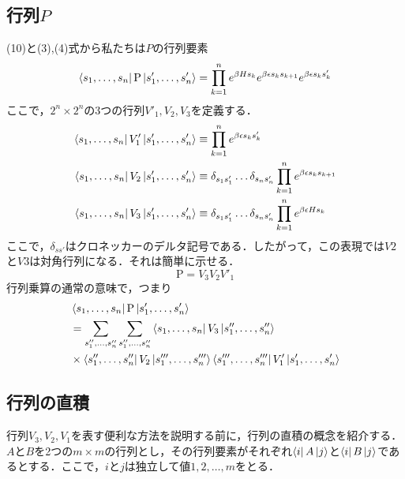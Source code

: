 \documentclass[a4paper,11pt]{jsarticle}
\begin{document}
\subsection*{行列$P$}
(10)と(3),(4)式から私たちは$P$の行列要素
\begin{equation}
  \bra{s_1,\dots,s_n}\mathrm{P}\ket{s'_1,\dots,s'_n} 
  = \prod_{k=1}^n e^{\beta H s_k} e^{\beta \epsilon s_k s_{k+1}} e^{\beta \epsilon s_k s'_k}
\end{equation}
ここで，$2^n \times 2^n$の3つの行列$V'_1, V_2, V_3$を定義する．
\begin{align}
  \bra{s_1,\dots,s_n}V'_1\ket{s'_1,\dots,s'_n}
  &\equiv \prod_{k=1}^n e^{\beta \epsilon s_k s'_k} \\
  \bra{s_1,\dots,s_n}V_2\ket{s'_1,\dots,s'_n}
  &\equiv \delta_{s_1 s'_1}\dots\delta_{s_n s'_n} \prod_{k=1}^n e^{\beta \epsilon s_k s_{k+1}} \\
  \bra{s_1,\dots,s_n}V_3\ket{s'_1,\dots,s'_n}
  &\equiv \delta_{s_1 s'_1}\dots\delta_{s_n s'_n} \prod_{k=1}^n e^{\beta \epsilon H s_k} \\
\end{align}
ここで，$\delta_{ss'}$はクロネッカーのデルタ記号である．したがって，この表現では$V2$と$V3$は対角行列になる．それは簡単に示せる．
\begin{equation}
  \mathrm{P} = V_3 V_2 V'_1
\end{equation}
行列乗算の通常の意味で，つまり
\begin{align}
  &\bra{s_1,\dots,s_n}\mathrm{P}\ket{s'_1,\dots,s'_n} \\
  &= \sum_{s''_1, \dots, s''_n} \sum_{s''_1, \dots, s''_n} \bra{s_1,\dots,s_n}V_3\ket{s''_1,\dots,s''_n} \\
  &\times \bra{s''_1,\dots,s''_n}V_2\ket{s'''_1,\dots,s'''_n} \bra{s'''_1,\dots,s'''_n}V'_1\ket{s'_1,\dots,s'_n} 
\end{align}

\subsection*{行列の直積}
行列$V_3,V_2,V_1$を表す便利な方法を説明する前に，行列の直積の概念を紹介する．$A$と$B$を2つの$m \times m$の行列とし，その行列要素がそれぞれ$\bra{i}A\ket{j}$と$\bra{i}B\ket{j}$であるとする．ここで，$i$と$j$は独立して値$1,2,\dots,m$をとる．
\end{document}
